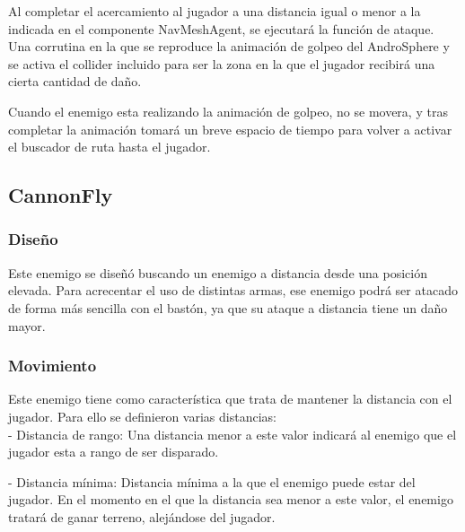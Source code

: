 \documentclass[12pt,spanish]{article}
\begin{document}
    Al completar el acercamiento al jugador a una distancia igual o menor a la indicada en el componente NavMeshAgent, se ejecutará la función de ataque. Una corrutina en la que se reproduce la animación de golpeo del AndroSphere y se activa el collider incluido para ser la zona en la que el jugador recibirá una cierta cantidad de daño.

    Cuando el enemigo esta realizando la animación de golpeo, no se movera, y tras completar la animación tomará un breve espacio de tiempo para volver a activar el buscador de ruta hasta el jugador.

\newpage

\subsection{CannonFly}

\subsubsection{Diseño}

    Este enemigo se diseñó buscando un enemigo a distancia desde una posición elevada. Para acrecentar el uso de distintas armas, ese enemigo podrá ser atacado de forma más sencilla con el bastón, ya que su ataque a distancia tiene un daño mayor.
    
\subsubsection{Movimiento}

    Este enemigo tiene como característica que trata de mantener la distancia con el jugador. Para ello se definieron varias distancias:\\


    - Distancia de rango: Una distancia menor a este valor indicará al enemigo que el jugador esta a rango de ser disparado.

    - Distancia mínima: Distancia mínima a la que el enemigo puede estar del jugador. En el momento en el que la distancia sea menor a este valor, el enemigo tratará de ganar terreno, alejándose del jugador.
\end{document}
